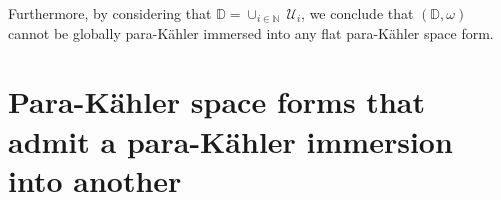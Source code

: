 \documentclass{article}
\newcommand{\R}{\mathds{R}}
\newcommand{\pk}{para-K\"ahler }
\newcommand{\N}{\mathds{N}}
\newcommand{\D}{\mathds{D}}
\begin{document}
Furthermore, by considering that $\D=\cup_{i\in\N} \ \mathcal{U}_i$, we conclude  that $(\D,\omega)$ cannot be globally \pk immersed into any flat \pk space form.
%
%
%
%
%





\section{Para-K\"ahler space forms that admit a \pk immersion into another}\label{pkspforms}
\end{document}
